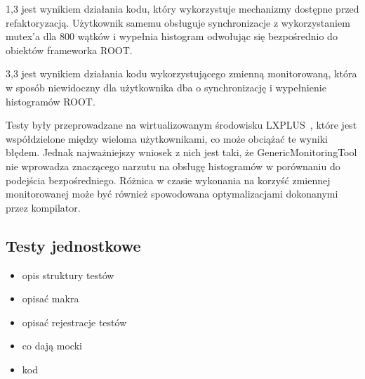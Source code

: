1,3 jest wynikiem działania kodu, który wykorzystuje mechanizmy dostępne przed refaktoryzacją.
Użytkownik samemu obsługuje synchronizacje z wykorzystaniem mutex'a dla 800 wątków i wypełnia histogram odwołując się bezpośrednio do obiektów frameworka ROOT.

3,3 jest wynikiem działania kodu wykorzystującego zmienną monitorowaną, która w sposób niewidoczny dla użytkownika dba o synchronizację i wypełnienie histogramów ROOT. 

Testy były przeprowadzane na wirtualizowanym środowisku LXPLUS~\cite{cern-lxplus}, które jest współdzielone między wieloma użytkownikami, co może obciążać te wyniki błędem. 
Jednak najważniejszy wniosek z nich jest taki, że GenericMonitoringTool nie wprowadza znaczącego narzutu na obsługę histogramów w porównaniu do podejścia bezpośredniego.
Różnica w czasie wykonania na korzyść zmiennej monitorowanej może być również spowodowana optymalizacjami dokonanymi przez kompilator. 

\subsection{Testy jednostkowe}
\begin{itemize}
\item opis struktury testów
\item opisać makra
\item opisać rejestracje testów
\item co dają mocki
\item kod~\cite{histogram-factory-test-suite}
\end{itemize}